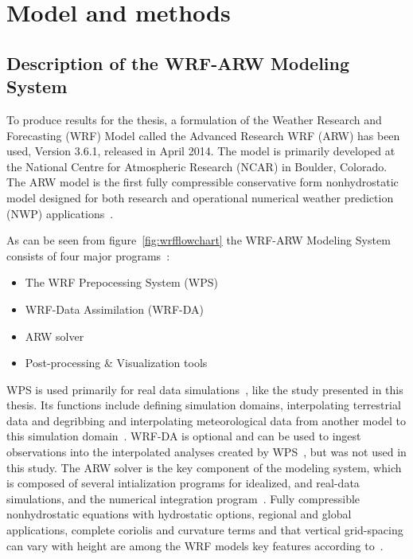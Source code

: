 \chapter{Model and methods}
\label{chap:modmet}
\section{Description of the WRF-ARW Modeling System}
\label{sec:modeldes}
To produce results for the thesis, a formulation of the Weather Research and Forecasting (WRF) Model called the Advanced Research WRF (ARW) has been used, Version 3.6.1, released in April 2014. The model is primarily developed at the National Centre for Atmospheric Research (NCAR) in Boulder, Colorado. The ARW model is the first fully compressible conservative form nonhydrostatic model designed for both research and operational numerical weather prediction (NWP) applications~\citep{Skamarock2008}. 

As can be seen from figure~\ref{fig:wrfflowchart} the WRF-ARW Modeling System consists of four major programs~\citep{Wang2015}:
\begin{itemize}
\item The WRF Prepocessing System (WPS)
\item WRF-Data Assimilation (WRF-DA)
\item ARW solver
\item Post-processing \& Visualization tools
\end{itemize}

WPS is used primarily for real data simulations~\citep{Wang2015}, like the study presented in this thesis. Its functions include defining simulation domains, interpolating terrestrial data and degribbing and interpolating meteorological data from another model to this simulation domain~\citep{Wang2015}. WRF-DA is optional and can be used to ingest observations into the interpolated analyses created by WPS~\citep{Wang2015}, but was not used in this study. The ARW solver is the key component of the modeling system, which is composed of several intialization programs for idealized, and real-data simulations, and the numerical integration program~\citep{Wang2015}. Fully compressible nonhydrostatic equations with hydrostatic options, regional and global applications, complete coriolis and curvature terms and that vertical grid-spacing can vary with height are among the WRF models key features according to~\citet{Wang2015}.

